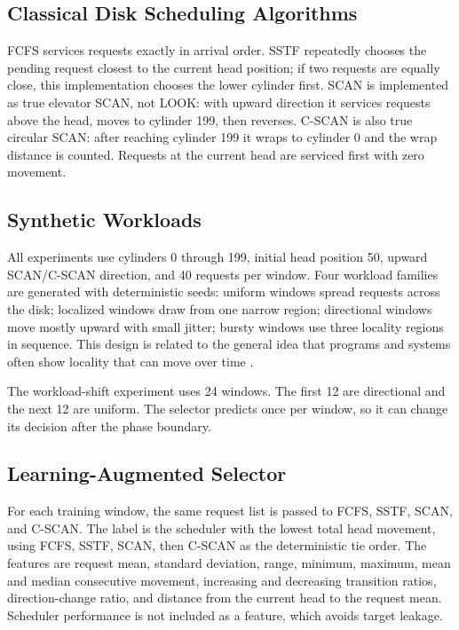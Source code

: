 \documentclass[11pt,a4paper]{article}
\begin{document}
\subsection{Classical Disk Scheduling Algorithms}
FCFS services requests exactly in arrival order. SSTF repeatedly chooses the pending request closest to the current head position; if two requests are equally close, this implementation chooses the lower cylinder first. SCAN is implemented as true elevator SCAN, not LOOK: with upward direction it services requests above the head, moves to cylinder 199, then reverses. C-SCAN is also true circular SCAN: after reaching cylinder 199 it wraps to cylinder 0 and the wrap distance is counted. Requests at the current head are serviced first with zero movement.

\subsection{Synthetic Workloads}
All experiments use cylinders 0 through 199, initial head position 50, upward SCAN/C-SCAN direction, and 40 requests per window. Four workload families are generated with deterministic seeds: uniform windows spread requests across the disk; localized windows draw from one narrow region; directional windows move mostly upward with small jitter; bursty windows use three locality regions in sequence. This design is related to the general idea that programs and systems often show locality that can move over time \cite{denning1968working}.

The workload-shift experiment uses 24 windows. The first 12 are directional and the next 12 are uniform. The selector predicts once per window, so it can change its decision after the phase boundary.

\subsection{Learning-Augmented Selector}
For each training window, the same request list is passed to FCFS, SSTF, SCAN, and C-SCAN. The label is the scheduler with the lowest total head movement, using FCFS, SSTF, SCAN, then C-SCAN as the deterministic tie order. The features are request mean, standard deviation, range, minimum, maximum, mean and median consecutive movement, increasing and decreasing transition ratios, direction-change ratio, and distance from the current head to the request mean. Scheduler performance is not included as a feature, which avoids target leakage.
\end{document}
